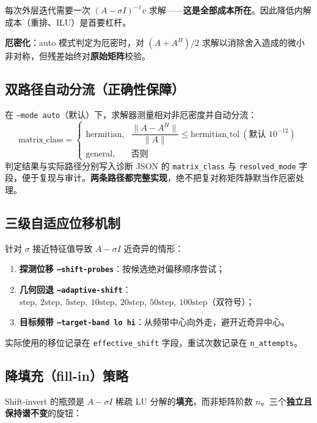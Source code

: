 \documentclass[11pt,a4paper]{ctexart}
\newcommand{\code}[1]{\texttt{\small #1}}
\begin{document}
每次外层迭代需要一次 $(A-\sigma I)^{-1} v$ 求解——\textbf{这是全部成本所在}。因此降低内解成本（重排、ILU）是首要杠杆。

\textbf{厄密化}：auto 模式判定为厄密时，对 $(A+A^{H})/2$ 求解以消除舍入造成的微小非对称，但残差始终对\textbf{原始矩阵}校验。

\subsection{双路径自动分流（正确性保障）}

在 \code{--mode auto}（默认）下，求解器测量相对非厄密度并自动分流：
\[
\text{matrix\_class} =
\begin{cases}
\text{hermitian}, & \dfrac{\lVert A - A^{H}\rVert}{\lVert A\rVert} \le \text{hermitian\_tol}\ (\text{默认 } 10^{-12})\\[0.6em]
\text{general},   & \text{否则}
\end{cases}
\]
判定结果与实际路径分别写入诊断 JSON 的 \code{matrix\_class} 与 \code{resolved\_mode} 字段，便于复现与审计。\textbf{两条路径都完整实现}，绝不把复对称矩阵静默当作厄密处理。

\subsection{三级自适应位移机制}

针对 $\sigma$ 接近特征值导致 $A-\sigma I$ 近奇异的情形：

\begin{enumerate}
  \item \textbf{探测位移 \code{--shift-probes}}：按候选绝对偏移顺序尝试；
  \item \textbf{几何回退 \code{--adaptive-shift}}：$\text{step},\ 2\text{step},\ 5\text{step},\ 10\text{step},\ 20\text{step},\ 50\text{step},\ 100\text{step}$（双符号）；
  \item \textbf{目标频带 \code{--target-band lo hi}}：从频带中心向外走，避开近奇异中心。
\end{enumerate}

实际使用的移位记录在 \code{effective\_shift} 字段，重试次数记录在 \code{n\_attempts}。

\subsection{降填充（fill-in）策略}

Shift-invert 的瓶颈是 $A-\sigma I$ 稀疏 LU 分解的\textbf{填充}，而非矩阵阶数 $n$。三个\textbf{独立且保持谱不变}的旋钮：
\end{document}
